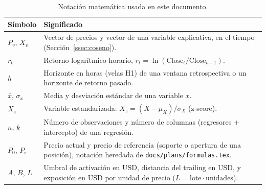 \documentclass[11pt,a4paper]{article}
\newcommand{\code}[1]{\texttt{\small #1}}
\begin{document}
\begin{table}[h]
\centering
\small
\begin{tabularx}{\linewidth}{@{}l X@{}}
\toprule
\textbf{Símbolo} & \textbf{Significado} \\
\midrule
\(P_v\), \(X_v\) & Vector de precios y vector de una variable explicativa, en el tiempo
  (Sección~\ref{ssec:coseno}). \\
\(r_t\) & Retorno logarítmico horario, \(r_t = \ln(\text{Close}_t/\text{Close}_{t-1})\). \\
\(h\) & Horizonte en horas (velas H1) de una ventana retrospectiva o un horizonte de
  retorno pasado. \\
\(\bar{x}\), \(\sigma_x\) & Media y desviación estándar de una variable \(x\). \\
\(X_z\) & Variable estandarizada: \(X_z = (X-\mu_X)/\sigma_X\) (z-score). \\
\(n\), \(k\) & Número de observaciones y número de columnas (regresores + intercepto) de
  una regresión. \\
\(P_0\), \(P_i\) & Precio actual y precio de referencia (soporte o apertura de una
  posición), notación heredada de \code{docs/plans/formulas.tex}. \\
\(A\), \(B\), \(L\) & Umbral de activación en USD, distancia del trailing en USD, y
  exposición en USD por unidad de precio (\(L = \text{lote}\cdot\text{unidades}\)). \\
\bottomrule
\end{tabularx}
\caption{Notación matemática usada en este documento.}
\end{table}
\end{document}

